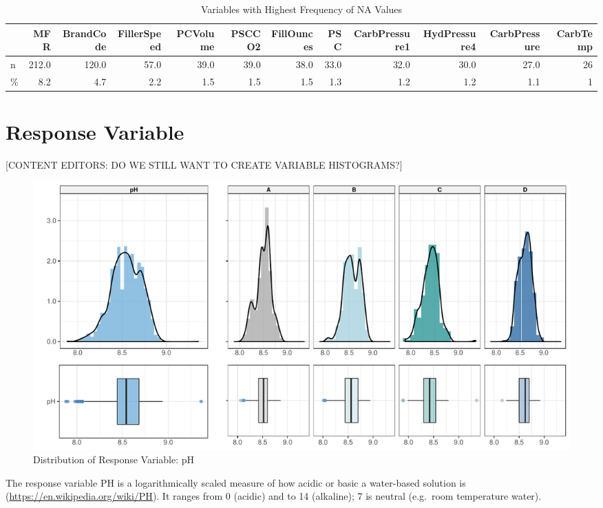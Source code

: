 \documentclass[]{report}
\begin{document}
\begin{table}[H]

\caption{\label{tab:unnamed-chunk-2}Variables with Highest Frequency of NA Values}
\centering
\fontsize{8}{10}\selectfont
\begin{tabular}{lrrrrrrrrrrr}
\toprule
\textbf{ } & \textbf{MFR} & \textbf{BrandCode} & \textbf{FillerSpeed} & \textbf{PCVolume} & \textbf{PSCCO2} & \textbf{FillOunces} & \textbf{PSC} & \textbf{CarbPressure1} & \textbf{HydPressure4} & \textbf{CarbPressure} & \textbf{CarbTemp}\\
\midrule
\rowcolor{gray!6}  n & 212.0 & 120.0 & 57.0 & 39.0 & 39.0 & 38.0 & 33.0 & 32.0 & 30.0 & 27.0 & 26\\
\% & 8.2 & 4.7 & 2.2 & 1.5 & 1.5 & 1.5 & 1.3 & 1.2 & 1.2 & 1.1 & 1\\
\bottomrule
\end{tabular}
\end{table}

\hypertarget{response-variable}{%
\section{Response Variable}\label{response-variable}}

{[}CONTENT EDITORS: DO WE STILL WANT TO CREATE VARIABLE HISTOGRAMS?{]}

\begin{figure}

\hfill{}\includegraphics[width=1\textwidth]{CONFLICT_Project_Update_files/figure-latex/unnamed-chunk-3-1} 

\caption{Distribution of Response Variable: pH}\label{fig:unnamed-chunk-3}
\end{figure}

The response variable PH is a logarithmically scaled measure of how
acidic or basic a water-based solution is
(\url{https://en.wikipedia.org/wiki/PH}). It ranges from 0 (acidic) and
to 14 (alkaline); 7 is neutral (e.g.~room temperature water).
\end{document}
